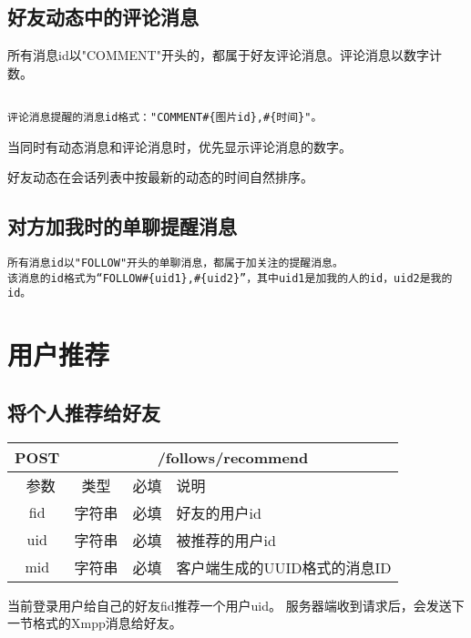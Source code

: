 \subsection{好友动态中的评论消息}
所有消息id以"COMMENT"开头的，都属于好友评论消息。评论消息以数字计数。
\begin{verbatim}

评论消息提醒的消息id格式："COMMENT#{图片id},#{时间}"。
\end{verbatim}

当同时有动态消息和评论消息时，优先显示评论消息的数字。

好友动态在会话列表中按最新的动态的时间自然排序。

\subsection{对方加我时的单聊提醒消息}
\begin{verbatim}
所有消息id以"FOLLOW"开头的单聊消息，都属于加关注的提醒消息。
该消息的id格式为“FOLLOW#{uid1},#{uid2}”，其中uid1是加我的人的id，uid2是我的id。
\end{verbatim}






\section{用户推荐}
\subsection{ 将个人推荐给好友}
\begin{table}[H]
   \begin{center}
\begin{tabular}{|c|c|c|p{12cm}|}
\hline
POST & \multicolumn{3}{|c|}{/follows/recommend} \\
\hline\hline
 \  参数  & 类型 & 必填 &  说明  \\
\hline
 fid  & 字符串 & 必填 &  好友的用户id\\
 \hline
 uid  & 字符串 & 必填 &  被推荐的用户id\\
\hline
 mid  & 字符串 & 必填 &  客户端生成的UUID格式的消息ID\\
\hline
\end{tabular}
   \end{center}
\end{table}
当前登录用户给自己的好友fid推荐一个用户uid。
服务器端收到请求后，会发送下一节格式的Xmpp消息给好友。

